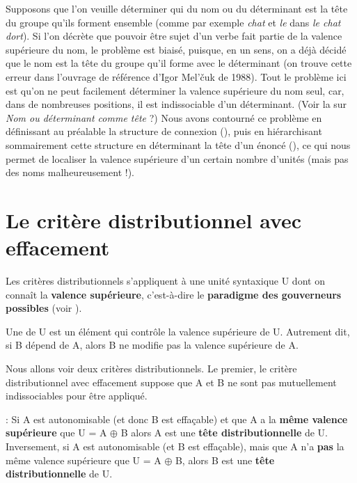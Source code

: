 Supposons que l’on veuille déterminer qui du nom ou du déterminant est la tête du groupe qu’ils forment ensemble (comme par exemple \textit{chat} et \textit{le} dans \textit{le chat dort}). Si l’on décrète que pouvoir être sujet d’un verbe fait partie de la valence supérieure du nom, le problème est biaisé, puisque, en un sens, on a déjà décidé que le nom est la tête du groupe qu’il forme avec le déterminant (on trouve cette erreur dans l’ouvrage de référence d’Igor Mel’čuk de 1988). Tout le problème ici est qu’on ne peut facilement déterminer la valence supérieure du nom seul, car, dans de nombreuses positions, il est indissociable d’un déterminant. (Voir la  sur \textit{Nom ou déterminant comme tête} ?) Nous avons contourné ce problème en définissant au préalable la structure de connexion (), puis en hiérarchisant sommairement cette structure en déterminant la tête d’un énoncé (), ce qui nous permet de localiser la valence supérieure d’un certain nombre d’unités (mais pas des noms malheureusement !).

\section{Le critère distributionnel avec effacement}\label{sec:3.3.11}

Les critères distributionnels s’appliquent à une unité syntaxique U dont on connaît la \textbf{valence supérieure}, c’est-à-dire le \textbf{paradigme des gouverneurs possibles} (voir ).

\begin{styleLivreImportant}
Une  de U est un élément qui contrôle la valence supérieure de U. Autrement dit, si B dépend de A, alors B ne modifie pas la valence supérieure de A.
\end{styleLivreImportant}

Nous allons voir deux critères distributionnels. Le premier, le critère distributionnel avec effacement suppose que A et B ne sont pas mutuellement indissociables pour être appliqué.

\begin{styleLivreImportant}
: Si A est autonomisable (et donc B est effaçable) et que A a la \textbf{même valence supérieure} que U = A ${\oplus}$ B alors A est une \textbf{tête distributionnelle} de U. Inversement, si A est autonomisable (et B est effaçable), mais que A n’a \textbf{pas} la même valence supérieure que U = A ${\oplus}$ B, alors B est une \textbf{tête distributionnelle} de U.
\end{styleLivreImportant}

